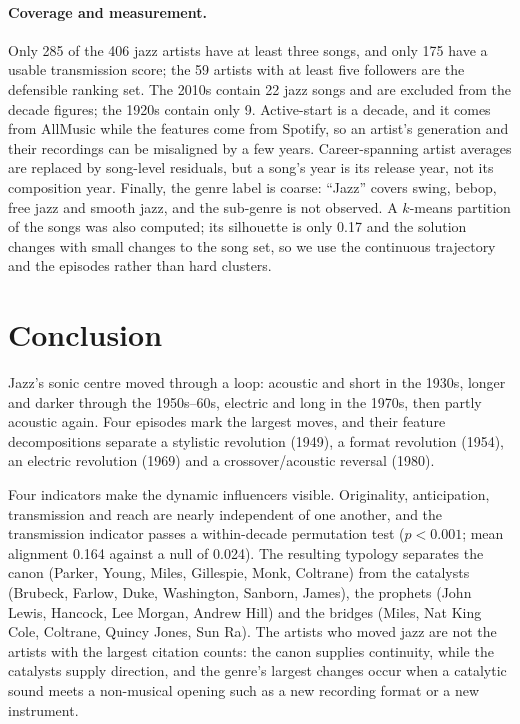 \documentclass[11pt]{article}
\begin{document}
\paragraph{Coverage and measurement.}
Only 285 of the 406 jazz artists have at least three songs, and only 175 have a usable
transmission score; the 59 artists with at least five followers are the defensible
ranking set. The 2010s contain 22 jazz songs and are excluded from the decade figures; the 1920s
contain only 9. Active-start is a decade, and it comes from AllMusic while the features come from
Spotify, so an artist's generation and their recordings can be misaligned by a few years.
Career-spanning artist averages are replaced by song-level residuals, but a song's year is its
release year, not its composition year.
Finally, the genre label is coarse: ``Jazz'' covers swing, bebop, free jazz and smooth jazz, and
the sub-genre is not observed.
A $k$-means partition of the songs was also computed; its silhouette is only 0.17 and the
solution changes with small changes to the song set, so we use the continuous trajectory and the
episodes rather than hard clusters.

\section{Conclusion}
Jazz's sonic centre moved through a loop: acoustic and short in the 1930s, longer and darker
through the 1950s--60s, electric and long in the 1970s, then partly acoustic again.
Four episodes mark the largest moves, and their feature decompositions separate a stylistic
revolution (1949), a format revolution (1954), an electric revolution (1969) and a
crossover/acoustic reversal (1980).

Four indicators make the dynamic influencers visible.
Originality, anticipation, transmission and reach are nearly independent of one another, and the
transmission indicator passes a within-decade permutation test ($p<0.001$; mean alignment 0.164
against a null of 0.024).
The resulting typology separates the canon (Parker, Young, Miles, Gillespie, Monk, Coltrane) from
the catalysts (Brubeck, Farlow, Duke, Washington, Sanborn, James), the prophets (John Lewis,
Hancock, Lee Morgan, Andrew Hill) and the bridges (Miles, Nat King Cole, Coltrane, Quincy Jones,
Sun Ra).
The artists who moved jazz are not the artists with the largest citation counts: the canon supplies
continuity, while the catalysts supply direction, and the genre's largest changes occur when a
catalytic sound meets a non-musical opening such as a new recording format or a new instrument.
\end{document}
